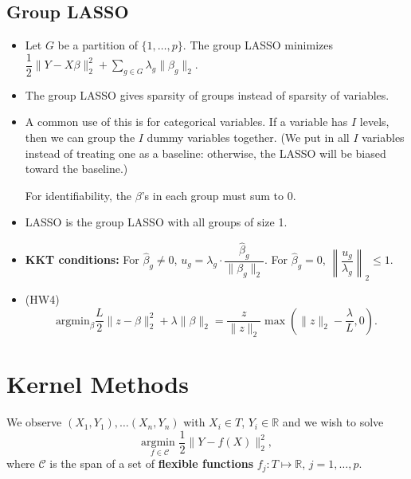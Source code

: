 \documentclass[twoside]{article}
\newcommand\dis{\displaystyle}
\newcommand\bbR{\mathbb{R}}
\newcommand\calC{\mathcal{C}}
\newcommand\lmb{\lambda}
\begin{document}
\subsection{Group LASSO}
\begin{itemize}
\item Let $G$ be a partition of $\{ 1, \dots, p\}$. The group LASSO minimizes $\dfrac{1}{2}\|Y - X\beta\|_2^2 + \dis\sum_{g \in G} \lmb_g \|\beta_g \|_2$.

\item The group LASSO gives sparsity of groups instead of sparsity of variables.

\item A common use of this is for categorical variables. If a variable has $I$ levels, then we can group the $I$ dummy variables together. (We put in all $I$ variables instead of treating one as a baseline: otherwise, the LASSO will be biased toward the baseline.)

For identifiability, the $\beta$'s in each group must sum to 0.

\item LASSO is the group LASSO with all groups of size 1.

\item \textbf{KKT conditions:} For $\hat{\beta}_g \neq 0$, $u_g = \lmb_g \cdot \dfrac{\hat{\beta}_g}{\|\beta_g\|_2}$. For $\hat{\beta}_g = 0$, $\left\|\dfrac{u_g}{\lmb_g}\right\|_2 \leq 1$.

\item (HW4) \[ \text{argmin}_{\beta} \frac{L}{2}\|z - \beta\|_2^2 + \lmb \|\beta\|_2 = \frac{z}{\|z\|_2} \max \left( \|z\|_2 - \frac{\lmb}{L}, 0 \right). \]
\end{itemize}

\section{Kernel Methods}
We observe $(X_1, Y_1), \dots (X_n, Y_n)$ with $X_i \in T$, $Y_i \in \bbR$ and we wish to solve
\[ \underset{f \in \calC}{\text{argmin }} \frac{1}{2} \| Y - f(X) \|_2^2, \]
where $\calC$ is the span of a set of \textbf{flexible functions} $f_j : T \mapsto \bbR$, $j = 1, \dots, p$.
\end{document}
